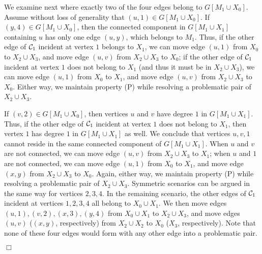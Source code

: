 \documentclass[11pt,twoside]{article}\usepackage{amssymb,latexsym,graphicx,hyperref}\usepackage{epstopdf}
\newenvironment{proof}{{\sc Proof. }}{\hfill$\Box$\vspace{0.2in}}
\begin{document}
\begin{proof}
We examine next where exactly two of the four edges belong to $G[M_1 \cup X_0]$.
Assume without loss of generality that $(u, 1) \in G[M_1 \cup X_0]$.
If $(y, 4) \in G[M_1 \cup X_0]$, then the connected component in $G[M_1 \cup X_1]$ containing $u$ has only one edge $(u, y)$, which belongs to $M_1$.
Thus, if the other edge of ${\cal C}_1$ incident at vertex $1$ belongs to $X_1$, we can move edge $(u, 1)$ from $X_0$ to $X_2 \cup X_3$,
and move edge $(u, v)$ from $X_2 \cup X_3$ to $X_0$;
if the other edge of ${\cal C}_1$ incident at vertex $1$ does not belong to $X_1$ (and thus it must be in $X_2 \cup X_3$),
we can move edge $(u, 1)$ from $X_0$ to $X_1$, and move edge $(u, v)$ from $X_2 \cup X_3$ to $X_0$.
Either way, we maintain property (P) while resolving a problematic pair of $X_2 \cup X_3$.

If $(v, 2) \in G[M_1 \cup X_0]$, then vertices $u$ and $v$ have degree $1$ in $G[M_1 \cup X_1]$.
Thus, if the other edge of ${\cal C}_1$ incident at vertex $1$ does not belong to $X_1$, then vertex $1$ has degree $1$ in $G[M_1 \cup X_1]$ as well.
We conclude that vertices $u, v, 1$ cannot reside in the same connected component of $G[M_1 \cup X_1]$.
When $u$ and $v$ are not connected, we can move edge $(u, v)$ from $X_2 \cup X_3$ to $X_1$;
when $u$ and $1$ are not connected, we can move edge $(u, 1)$ from $X_0$ to $X_1$, and move edge $(x, y)$ from $X_2 \cup X_3$ to $X_0$.
Again, either way, we maintain property (P) while resolving a problematic pair of $X_2 \cup X_3$.
Symmetric scenarios can be argued in the same way for vertices $2, 3, 4$.
In the remaining scenario, the other edges of ${\cal C}_1$ incident at vertices $1, 2, 3, 4$ all belong to $X_0 \cup X_1$.
We then move edges $(u, 1), (v, 2), (x, 3), (y, 4)$ from $X_0 \cup X_1$ to $X_2 \cup X_3$,
and move edges $(u, v)$ ($(x, y)$, respectively) from $X_2 \cup X_2$ to $X_0$ ($X_3$, respectively).
Note that none of these four edges would form with any other edge into a problematic pair.


\end{proof}
\end{document}
